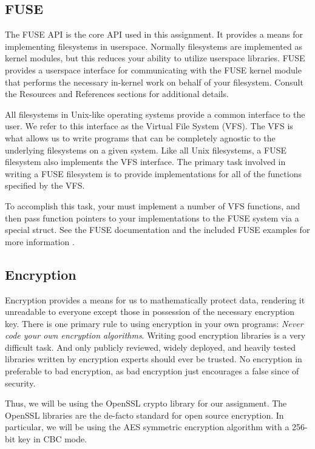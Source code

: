 \documentclass[12pt]{article}
\begin{document}
\subsection{FUSE}

The FUSE API\cite{fuse-refs} is the core API used in this
assignment. It provides a means for implementing filesystems in
userspace. Normally filesystems are implemented as kernel modules, but
this reduces your ability to utilize userspace libraries. FUSE
provides a userspace interface for communicating with the FUSE kernel
module that performs the necessary in-kernel work on behalf of your
filesystem. Consult the Resources and References sections for additional
details.

All filesystems in Unix-like operating systems provide a common
interface to the user. We refer to this interface as the Virtual File
System (VFS)\cite{linux-vfs}. The VFS is what allows us to write
programs that can be completely agnostic to the underlying filesystems
on a given system. Like all Unix filesystems, a FUSE filesystem also
implements the VFS interface. The primary task involved in writing a
FUSE filesystem is to provide implementations for all of the functions
specified by the VFS.

To accomplish this task, your must implement a number of VFS functions,
and then pass function pointers to your implementations to the FUSE
system via a special struct. See the FUSE documentation and the included
FUSE examples for more information
\cite{fuse-website,fuse-refs,fuse-wiki,pfeiffer-fuse}.

\subsection{Encryption}

Encryption provides a means for us to mathematically protect data,
rendering it unreadable to everyone except those in possession of the
necessary encryption key. There is one primary rule to using
encryption in your own programs: \emph{Never code your own encryption
 algorithms}. Writing good encryption libraries is a very difficult
task. And only publicly reviewed, widely deployed, and heavily tested
libraries written by encryption experts should ever be trusted. No
encryption in preferable to bad encryption, as bad encryption just
encourages a false since of security.

Thus, we will be using the OpenSSL\cite{openssl-website} crypto
library\cite{openssl-evp} for our
assignment. The OpenSSL libraries are the de-facto standard for open
source encryption. In particular, we will be using the AES symmetric
encryption algorithm with a 256-bit key in CBC mode.
\end{document}

